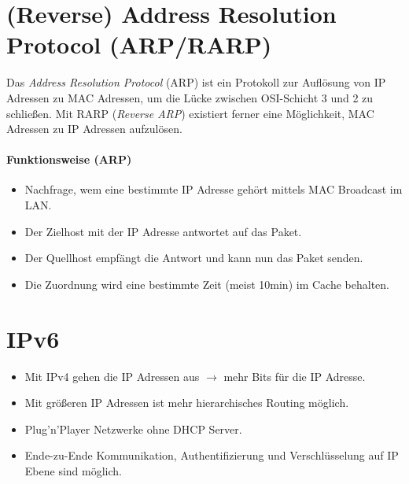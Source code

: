     \section{(Reverse) Address Resolution Protocol (ARP/RARP)}
        Das \textit{Address Resolution Protocol} (ARP) ist ein Protokoll zur Auflösung von IP Adressen zu MAC Adressen, um die Lücke zwischen OSI-Schicht 3 und 2 zu schließen. Mit RARP (\textit{Reverse ARP}) existiert ferner eine Möglichkeit, MAC Adressen zu IP Adressen aufzulösen.
        
        \paragraph{Funktionsweise (ARP)}
	        \begin{itemize}
	        	\item Nachfrage, wem eine bestimmte IP Adresse gehört mittels MAC Broadcast im LAN.
	        	\item Der Zielhost mit der IP Adresse antwortet auf das Paket.
	        	\item Der Quellhost empfängt die Antwort und kann nun das Paket senden.
	        	\item Die Zuordnung wird eine bestimmte Zeit (meist 10min) im Cache behalten.
	        \end{itemize}
	        

    \section{IPv6}
        \begin{itemize}
        	\item Mit IPv4 gehen die IP Adressen aus \( \rightarrow \) mehr Bits für die IP Adresse.
        	\item Mit größeren IP Adressen ist mehr hierarchisches Routing möglich.
        	\item Plug'n'Player Netzwerke ohne DHCP Server.
        	\item Ende-zu-Ende Kommunikation, Authentifizierung und Verschlüsselung auf IP Ebene sind möglich.
        \end{itemize}

